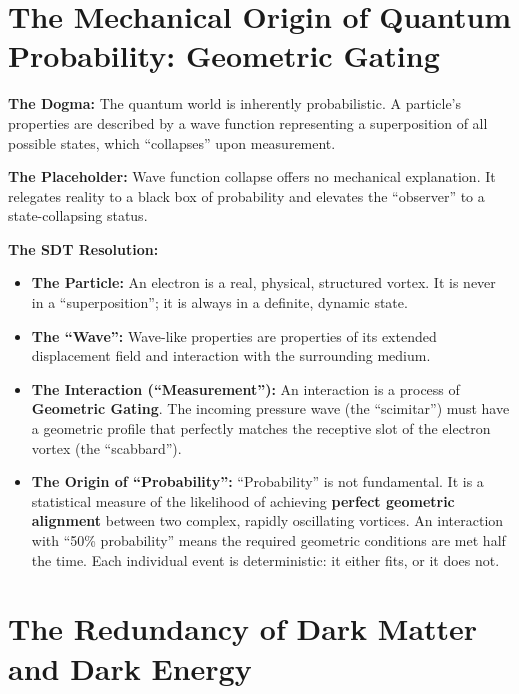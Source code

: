 \section{The Mechanical Origin of Quantum Probability: Geometric Gating}

\textbf{The Dogma:} The quantum world is inherently probabilistic.  A particle's properties are described by a wave function representing a superposition of all possible states, which ``collapses'' upon measurement.

\textbf{The Placeholder:} Wave function collapse offers no mechanical explanation.  It relegates reality to a black box of probability and elevates the ``observer'' to a state-collapsing status.

\textbf{The SDT Resolution:}
\begin{itemize}
  \item \textbf{The Particle:} An electron is a real, physical, structured vortex.  It is never in a ``superposition''; it is always in a definite, dynamic state.
  \item \textbf{The ``Wave'':} Wave-like properties are properties of its extended displacement field and interaction with the surrounding medium.
  \item \textbf{The Interaction (``Measurement''):} An interaction is a process of \textbf{Geometric Gating}.  The incoming pressure wave (the ``scimitar'') must have a geometric profile that perfectly matches the receptive slot of the electron vortex (the ``scabbard'').
  \item \textbf{The Origin of ``Probability'':} ``Probability'' is not fundamental.  It is a statistical measure of the likelihood of achieving \textbf{perfect geometric alignment} between two complex, rapidly oscillating vortices.  An interaction with ``50\% probability'' means the required geometric conditions are met half the time.  Each individual event is deterministic: it either fits, or it does not.
\end{itemize}


\section{The Redundancy of Dark Matter and Dark Energy}

